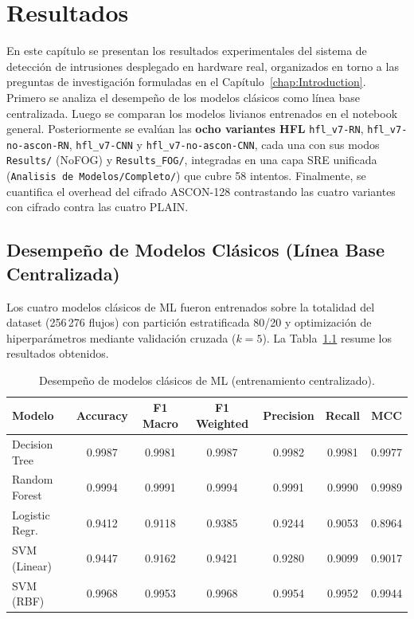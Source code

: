 \chapter{Resultados}
\label{chap:resu}

En este capítulo se presentan los resultados experimentales del sistema de detección de intrusiones desplegado en hardware real, organizados en torno a las preguntas de investigación formuladas en el Capítulo~\ref{chap:Introduction}. Primero se analiza el desempeño de los modelos clásicos como línea base centralizada. Luego se comparan los modelos livianos entrenados en el notebook general. Posteriormente se evalúan las \textbf{ocho variantes HFL} \texttt{hfl\_v7-RN}, \texttt{hfl\_v7-no-ascon-RN}, \texttt{hfl\_v7-CNN} y \texttt{hfl\_v7-no-ascon-CNN}, cada una con sus modos \texttt{Results/} (NoFOG) y \texttt{Results\_FOG/}, integradas en una capa SRE unificada (\texttt{Analisis de Modelos/Completo/}) que cubre 58 intentos. Finalmente, se cuantifica el overhead del cifrado ASCON-128 contrastando las cuatro variantes con cifrado contra las cuatro PLAIN.

\section{Desempeño de Modelos Clásicos (Línea Base Centralizada)}
\label{sec:res_classic}

Los cuatro modelos clásicos de ML fueron entrenados sobre la totalidad del dataset (256\,276 flujos) con partición estratificada 80/20 y optimización de hiperparámetros mediante validación cruzada ($k=5$). La Tabla~\ref{tab:classic_results} resume los resultados obtenidos.

\begin{table}[H]
\centering
\caption{Desempeño de modelos clásicos de ML (entrenamiento centralizado).}
\label{tab:classic_results}
\small
\begin{tabular}{l c c c c c c}
\toprule
\textbf{Modelo} & \textbf{Accuracy} & \textbf{F1 Macro} & \textbf{F1 Weighted} & \textbf{Precision} & \textbf{Recall} & \textbf{MCC} \\
\midrule
Decision Tree      & 0.9987 & 0.9981 & 0.9987 & 0.9982 & 0.9981 & 0.9977 \\
Random Forest      & 0.9994 & 0.9991 & 0.9994 & 0.9991 & 0.9990 & 0.9989 \\
Logistic Regr.     & 0.9412 & 0.9118 & 0.9385 & 0.9244 & 0.9053 & 0.8964 \\
SVM (Linear)       & 0.9447 & 0.9162 & 0.9421 & 0.9280 & 0.9099 & 0.9017 \\
SVM (RBF)          & 0.9968 & 0.9953 & 0.9968 & 0.9954 & 0.9952 & 0.9944 \\
\bottomrule
\end{tabular}
\end{table}


